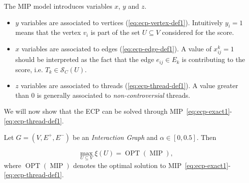 The \acrshort{MIP} model introduces variables $x$, $y$ and $z$.
\begin{itemize}
	\item $y$ variables are associated to vertices
	      (\autoref{eq:ecp-vertex-def1}). Intuitively $y_i = 1$ means that the
	      vertex $v_{i} $ is part of the set $U \subseteq V$ considered for the
	      score.
	\item $x$ variables are associated to edges (\autoref{eq:ecp-edge-def1}).
	      A value of $x_{ij}^{k} = 1$ should be interpreted as the fact that
	      the edge $e_{ij} \in E_k$ is contributing to the score,
	      i.e. $T_k \in \mathcal{S}_{C} (U)$.
	\item $z$ variables are associated to threads
	      (\autoref{eq:ecp-thread-def1}). A value greater than 0
	      is generally associated to \emph{non-controversial} threads.
\end{itemize}

We will now show that the \acrshort{ECP} can be solved through
MIP~\eqref{eq:ecp-exact1}-\eqref{eq:ecp-thread-def1}.

\begin{theorem}
	\label{th:ecp-mip}
	Let $G = (V, E^{+}, E^{-})$ be an \emph{Interaction Graph} and $\alpha \in
		[0, 0.5]$. Then

	\begin{equation}
		\max_{U \subseteq V} \xi(U) = \operatorname{OPT}(\operatorname{MIP}),
	\end{equation}
	where $\operatorname{OPT}(\operatorname{MIP})$ denotes the optimal solution to
	MIP~\eqref{eq:ecp-exact1}-\eqref{eq:ecp-thread-def1}.
\end{theorem}

